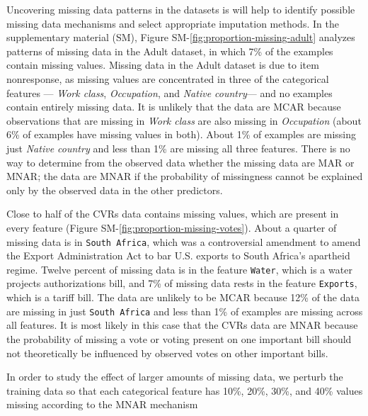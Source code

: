 \documentclass[10pt]{book}
\theoremstyle{definition}
\begin{document}
Uncovering missing data patterns in the datasets is will help to identify possible missing data mechanisms and select appropriate imputation methods. In the supplementary material (SM), Figure SM-\ref{fig:proportion-missing-adult} analyzes patterns of missing data in the Adult dataset, in which 7\% of the examples contain missing values. Missing data in the Adult dataset is due to item nonresponse, as missing values are concentrated in three of the categorical features --- \emph{Work class}, \emph{Occupation}, and \emph{Native country}--- and no examples contain entirely missing data. It is unlikely that the data are MCAR because observations that are missing in \emph{Work class} are also missing in \emph{Occupation} (about 6\% of examples have missing values in both). About 1\% of examples are missing just \emph{Native country} and less than 1\% are missing all three features. There is no way to determine from the observed data whether the missing data are MAR or MNAR; the data are MNAR if the probability of missingness cannot be explained only by the observed data in the other predictors.

Close to half of the CVRs data contains missing values, which are present in every feature (Figure SM-\ref{fig:proportion-missing-votes}). About a quarter of missing data is in \texttt{South Africa}, which was a controversial amendment to amend the Export Administration Act to bar U.S. exports to South Africa's apartheid regime. Twelve percent of missing data is in the feature \texttt{Water}, which is a water projects authorizations bill, and 7\% of missing data rests in the feature \texttt{Exports}, which is a tariff bill. The data are unlikely to be MCAR because 12\% of the data are missing in just \texttt{South Africa} and less than 1\% of examples are missing across all features. It is most likely in this case that the CVRs data are MNAR because the probability of missing a vote or voting present on one important bill should not theoretically be influenced by observed votes on other important bills. 

\par
{}

In order to study the effect of larger amounts of missing data, we perturb the training data so that each categorical feature has 10\%, 20\%, 30\%, and 40\% values missing according to the MNAR mechanism
 
\end{document}

